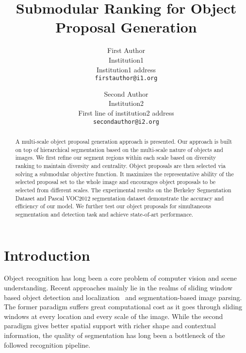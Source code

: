 \documentclass[10pt,twocolumn,letterpaper]{article}
\begin{document}
\title{Submodular Ranking for Object Proposal Generation}

\author{First Author\\
Institution1\\
Institution1 address\\
{\tt\small firstauthor@i1.org}
\and
Second Author\\
Institution2\\
First line of institution2 address\\
{\tt\small secondauthor@i2.org}
}

\maketitle

\begin{abstract}
	A multi-scale object proposal generation approach is presented. Our approach is built on top of hierarchical segmentation based on the multi-scale nature of objects and images. We first refine our segment regions within each scale based on diversity ranking to maintain diversity and centrality. Object proposals are then selected via solving a submodular objective function. It maximizes the representative ability of the selected proposal set to the whole image and encourages object proposals to be selected from different scales. The experimental results on the Berkeley Segmentation Dataset and Pascal VOC2012 segmentation dataset demonstrate the accuracy and efficiency of our model. We further test our object proposals for simultaneous segmentation and detection task and achieve state-of-art performance.
\end{abstract}



\section{Introduction}
Object recognition has long been a core problem of computer vision and scene understanding. Recent approaches mainly lie in the realms of sliding window based object detection and localization~\cite{Viola04, Dalal05, Felzenszwalb10} and segmentation-based image parsing. The former paradigm suffers great computational cost as it goes through sliding windows at every location and every scale of the image. While the second paradigm gives better spatial support with richer shape and contextual information, the quality of segmentation has long been a bottleneck of the followed recognition pipeline.
\end{document}

